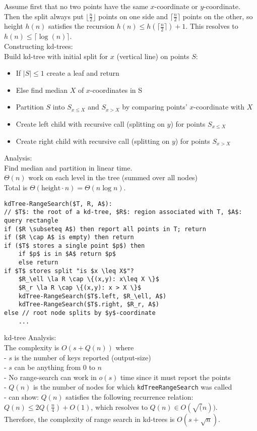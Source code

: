 \documentclass[12pt]{article}
\newcommand{\la}{\leftarrow}
\begin{document}
{Assume first that no two points have the same $x$-coordinate or $y$-coordinate. Then the split always put $\lfloor \frac{n}{2} \rfloor$ points on one side and $\lceil \frac{n}{2} \rceil$ points on the other, so height $h(n)$ satisfies the recursion $h(n) \leq h(\lceil \frac{n}{2} \rceil) + 1$. This resolves to $h(n) \leq \lceil \log(n) \rceil$. \\

Constructing kd-trees:\\
Build kd-tree with initial split for $x$ (vertical line) on points $S$:
\begin{itemize}
    \renewcommand\labelitemi{--}
	\item If $|S| \leq 1$ create a leaf and return
	\item Else find median $X$ of $x$-coordinates in S
	\item Partition $S$ into $S_{x\le X}$ and $S_{x>X}$ by comparing points' $x$-coordinate with $X$
	\item Create left child with recursive call (splitting on $y$) for points $S_{x\leq X}$
	\item Create right child with recursive call (splitting on $y$) for points $S_{x>X}$
\end{itemize}
Analysis:\\
Find median and partition in linear time.\\
$\Theta(n)$ work on each level in the tree (summed over all nodes)\\
Total is $\Theta(\text{height}\cdot n) = \Theta(n \log n)$.\\

\begin{lstlisting}[mathescape=true, showstringspaces=false]
kdTree-RangeSearch($T, R, A$):
// $T$: the root of a kd-tree, $R$: region associated with T, $A$: query rectangle
if ($R \subseteq A$) then report all points in T; return
if ($R \cap A$ is empty) then return
if ($T$ stores a single point $p$) then
	if $p$ is in $A$ return $p$
	else return
if $T$ stores split "is $x \leq X$"?
	$R_\ell \la R \cap \{(x,y): x\leq X \}$ 
	$R_r \la R \cap \{(x,y): x > X \}$ 
	kdTree-RangeSearch($T$.left, $R_\ell, A$)
	kdTree-RangeSearch($T$.right, $R_r, A$)
else // root node splits by $y$-coordinate
    ...
\end{lstlisting}

kd-tree Analysis:\\
The complexity is $O(s + Q(n))$ where\\
- $s$ is the number of keys reported (output-size)\\
- $s$ can be anything from 0 to $n$\\
- No range-search can work in $o(s)$ time since it must report the points\\
- $Q(n)$ is the number of nodes for which \texttt{kdTreeRangeSearch} was called\\
- can show: $Q(n)$ satisfies the following recurrence relation: $Q(n) \leq 2Q(\frac{n}{4}) + O(1)$, which resolves to $Q(n) \in O(\sqrt(n))$. \\
Therefore, the complexity of range search in kd-trees is $O(s+\sqrt{n})$.\\

}
\end{document}
